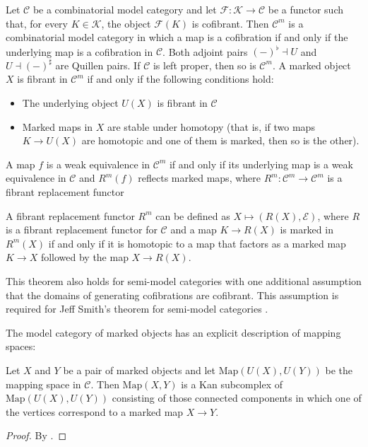 \documentclass[reqno]{amsart}
\theoremstyle{definition}
\theoremstyle{remark}
\newcommand{\cat}[1]{\mathcal{#1}}
\newcommand{\C}{\cat{C}}
\numberwithin{figure}{section}
\begin{document}
\begin{thm}
Let $\C$ be a combinatorial model category and let $\mathcal{F} : \mathcal{K} \to \C$ be a functor such that, for every $K \in \mathcal{K}$, the object $\mathcal{F}(K)$ is cofibrant.
Then $\C^m$ is a combinatorial model category in which a map is a cofibration if and only if the underlying map is a cofibration in $\C$.
Both adjoint pairs $(-)^\flat \dashv U$ and $U \dashv (-)^\sharp$ are Quillen pairs.
If $\C$ is left proper, then so is $\C^m$.
A marked object $X$ is fibrant in $\C^m$ if and only if the following conditions hold:
\begin{itemize}
\item The underlying object $U(X)$ is fibrant in $\C$
\item Marked maps in $X$ are stable under homotopy (that is, if two maps $K \to U(X)$ are homotopic and one of them is marked, then so is the other).
\end{itemize}
A map $f$ is a weak equivalence in $\C^m$ if and only if its underlying map is a weak equivalence in $\C$ and $R^m(f)$ reflects marked maps, where $R^m : \C^m \to \C^m$ is a fibrant replacement functor

A fibrant replacement functor $R^m$ can be defined as $X \mapsto (R(X),\mathcal{E})$,
where $R$ is a fibrant replacement functor for $\C$ and a map $K \to R(X)$ is marked in $R^m(X)$ if and only if
it is homotopic to a map that factors as a marked map $K \to X$ followed by the map $X \to R(X)$.
\end{thm}

\begin{remark}
This theorem also holds for semi-model categories with one additional assumption that the domains of generating cofibrations are cofibrant.
This assumption is required for Jeff Smith's theorem for semi-model categories \cite[Theorem~3.1]{semi-smith}.
\end{remark}

The model category of marked objects has an explicit description of mapping spaces:

\begin{lem}
Let $X$ and $Y$ be a pair of marked objects and let $\mathrm{Map}(U(X),U(Y))$ be the mapping space in $\C$.
Then $\mathrm{Map}(X,Y)$ is a Kan subcomplex of $\mathrm{Map}(U(X),U(Y))$ consisting of those connected components in which one of the vertices correspond to a marked map $X \to Y$.
\end{lem}
\begin{proof}
By \cite[Lemma~3.4]{marked-obj}.
\end{proof}
\end{document}
